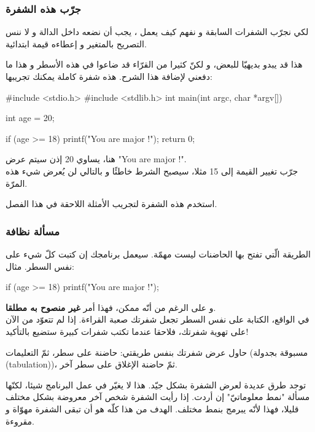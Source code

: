 \subsubsection{جرّب هذه الشفرة}
لكي نجرّب الشفرات السابقة و نفهم كيف يعمل ، يجب أن نضعه داخل الدالة
و لا ننس التصريح بالمتغير 
و إعطاءه قيمة ابتدائية.

هذا قد يبدو بديهيّا للبعض، و لكنّ كثيرا من القرّاء قد ضاعوا في هذه الأسطر و هذا ما دفعني لإضافة هذا الشرح. هذه شفرة كاملة يمكنك تجريبها:

\begin{Csource}
#include <stdio.h>
#include <stdlib.h>
int main(int argc, char *argv[])
{
	int age = 20;
	
	if (age >= 18)
	{
		printf("You are major !\n");
	}
	return 0;
}
\end{Csource}

هنا،
يساوي 20 إذن سيتم عرض
"\textenglish{You are major !}".\\
جرّب تغيير القيمة إلى 15 مثلا، سيصبح الشرط خاطئًا و بالتالي لن يُعرض شيء هذه المرّة.

استخدم هذه الشفرة لتجريب الأمثلة اللاحقة في هذا الفصل.

\subsubsection{مسألة نظافة}

الطريقة الّتي تفتح بها الحاضنات ليست مهمّة. سيعمل برنامجك إن كتبت كلّ شيء على نفس السطر. مثال:

\begin{Csource}
if (age >= 18) { printf("You are major !"); }
\end{Csource}

و على الرغم من أنّه ممكن، فهذا أمر
\textbf{غير منصوح به مطلقا}.\\
في الواقع، الكتابة على نفس السطر تجعل شفرتك صعبة القراءة. إذا لم تتعوّد من الآن على تهوية شفرتك، فلاحقا عندما تكتب شفرات كبيرة ستضيع بالتأكيد!

حاول عرض شفرتك بنفس طريقتي: حاضنة على سطر، ثمّ التعليمات (مسبوقة بجدولة 
(\textenglish{tabulation}))،
 ثمّ حاضنة الإغلاق على سطر آخر.

\begin{information}
توجد طرق عديدة لعرض الشفرة بشكل جيّد. هذا لا يغيّر في عمل البرنامج شيئا، لكنّها مسألة "نمط معلوماتيّ" إن أردت. إذا رأيت الشفرة شخص آخر معروضة بشكل مختلف قليلا، فهذا لأنّه يبرمج بنمط مختلف. الهدف من هذا كلّه هو أن تبقى الشفرة مهوّاة و مقروءة.
\end{information}

